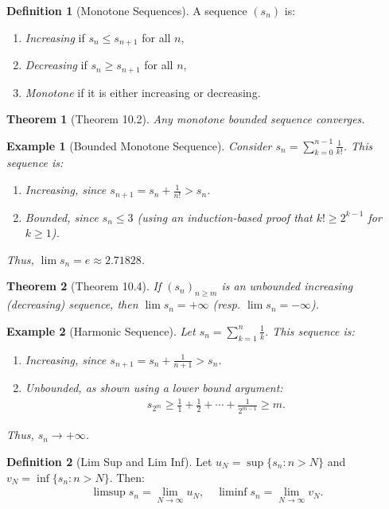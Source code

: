 \documentclass[7pt]{article}
\theoremstyle{definition}
\newtheorem{definition}{Definition}
\theoremstyle{plain}
\newtheorem{theorem}{Theorem}
\newtheorem{example}{Example}
\begin{document}
\begin{definition}[Monotone Sequences]
A sequence $ (s_n) $ is:
\begin{enumerate}
    \item \emph{Increasing} if $ s_n \leq s_{n+1} $ for all $ n $,
    \item \emph{Decreasing} if $ s_n \geq s_{n+1} $ for all $ n $,
    \item \emph{Monotone} if it is either increasing or decreasing.
\end{enumerate}
\end{definition}

\begin{theorem}[Theorem 10.2]
Any monotone bounded sequence converges.
\end{theorem}

\begin{example}[Bounded Monotone Sequence]
Consider $ s_n = \sum_{k=0}^{n-1} \frac{1}{k!} $. This sequence is:
\begin{enumerate}
    \item Increasing, since $ s_{n+1} = s_n + \frac{1}{n!} > s_n $.
    \item Bounded, since $ s_n \leq 3 $ (using an induction-based proof that $ k! \geq 2^{k-1} $ for $ k \geq 1 $).
\end{enumerate}
Thus, $ \lim s_n = e \approx 2.71828 $.
\end{example}

\begin{theorem}[Theorem 10.4]
If $ (s_n)_{n \geq m} $ is an unbounded increasing (decreasing) sequence, then $ \lim s_n = +\infty $ (resp. $ \lim s_n = -\infty $).
\end{theorem}

\begin{example}[Harmonic Sequence]
Let $ s_n = \sum_{k=1}^n \frac{1}{k} $. This sequence is:
\begin{enumerate}
    \item Increasing, since $ s_{n+1} = s_n + \frac{1}{n+1} > s_n $.
    \item Unbounded, as shown using a lower bound argument:
    \begin{align}
    s_{2^m} \geq \frac{1}{1} + \frac{1}{2} + \cdots + \frac{1}{2^{m-1}} \geq m.
    \end{align}
\end{enumerate}
Thus, $ s_n \to +\infty $.
\end{example}

\begin{definition}[Lim Sup and Lim Inf]
Let $ u_N = \sup\{s_n : n > N\} $ and $ v_N = \inf\{s_n : n > N\} $. Then:
\begin{align}
\limsup s_n = \lim_{N \to \infty} u_N, \quad \liminf s_n = \lim_{N \to \infty} v_N.
\end{align}
\end{definition}
\end{document}
